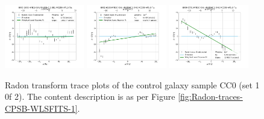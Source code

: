 \begin{figure}
    \includegraphics[width=0.31\textwidth]{Images/WLSFITS/CC0/8932-1901.png}
    \includegraphics[width=0.31\textwidth]{Images/WLSFITS/CC0/8932-6103.png}
    \includegraphics[width=0.31\textwidth]{Images/WLSFITS/CC0/8939-3701.png}
%
    \caption{Radon transform trace plots of the control galaxy sample CC0 (set 1 0f 2). The content description is as per Figure \ref{fig:Radon-traces-CPSB-WLSFITS-1}.}
    \label{fig:Radon-traces-CC0-WLSFITS-1}
\end{figure}

